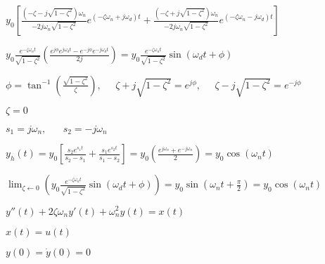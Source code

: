 \documentclass{article}
\def\lthtmlcheckvsize{\ifdim\ht\sizebox<\vsize 
  \ifdim\wd\sizebox<\hsize\expandafter\hfill\fi \expandafter\vfill
  \else\expandafter\vss\fi}%
\begin{document}
{\newpage\clearpage
{}%
$\displaystyle y_0\left[ \frac{(-\zeta-j\sqrt{1-\zeta^2})\omega_n}{-2j\omega_n\sqrt{1-\zeta^2}} e^{(-\zeta\omega_n+j\omega_d)t}
+\frac{(-\zeta+j\sqrt{1-\zeta^2})\omega_n}{-2j\omega_n\sqrt{1-\zeta^2}} e^{(-\zeta\omega_n-j\omega_d)t} \right]$%
\lthtmlindisplaymathZ
\lthtmlcheckvsize\clearpage}

{\newpage\clearpage
{}%
$\displaystyle y_0\frac{e^{-\zeta\omega_nt}}{\sqrt{1-\zeta^2}} \left(\frac{e^{j\phi}e^{j\omega_dt}-e^{-j\phi}e^{-j\omega_dt}}{2j}\right)
=y_0\frac{e^{-\zeta\omega_nt}}{\sqrt{1-\zeta^2}} \sin(\omega_dt+\phi)$%
\lthtmlindisplaymathZ
\lthtmlcheckvsize\clearpage}

{\newpage\clearpage
{}%
$\displaystyle \phi=\tan^{-1}\left( \frac{\sqrt{1-\zeta^2}}{\zeta} \right),\;\;\;\;\;
\zeta+j\sqrt{1-\zeta^2}=e^{j\phi},\;\;\;\;\;\zeta-j\sqrt{1-\zeta^2}=e^{-j\phi}$%
\lthtmlindisplaymathZ
\lthtmlcheckvsize\clearpage}

{\newpage\clearpage
{}%
$ \zeta =0$%
\lthtmlindisplaymathZ
\lthtmlcheckvsize\clearpage}

{\newpage\clearpage
{}%
$\displaystyle s_1=j\omega_n,\;\;\;\;\;\;s_2=-j\omega_n$%
\lthtmlindisplaymathZ
\lthtmlcheckvsize\clearpage}

{\newpage\clearpage
{}%
$\displaystyle y_h(t)=y_0 \left[ \frac{s_2 e^{s_1t}}{s_2-s_1}+\frac{s_1 e^{s_2t}}{s_1-s_2} \right]
=y_0\left(\frac{e^{j\omega_n}+e^{-j\omega_n}}{2}\right)=y_0\cos(\omega_nt)$%
\lthtmlindisplaymathZ
\lthtmlcheckvsize\clearpage}

{\newpage\clearpage
{}%
$\displaystyle \lim_{\zeta\leftarrow 0} \left(y_0\frac{e^{-\zeta\omega_nt}}{\sqrt{1-\zeta^2}} \sin(\omega_dt+\phi) \right)
=y_0\sin(\omega_nt+\frac{\pi}{2})=y_0\cos(\omega_nt)$%
\lthtmlindisplaymathZ
\lthtmlcheckvsize\clearpage}

{\newpage\clearpage
{}%
$\displaystyle y''(t)+2\zeta\omega_n y'(t)+\omega_n^2 y(t)=x(t)$%
\lthtmlindisplaymathZ
\lthtmlcheckvsize\clearpage}

{\newpage\clearpage
{}%
$ x(t)=u(t)$%
\lthtmlindisplaymathZ
\lthtmlcheckvsize\clearpage}

{\newpage\clearpage
{}%
$ y(0)=\dot{y}(0)=0$%
\lthtmlindisplaymathZ
\lthtmlcheckvsize\clearpage}
\end{document}
